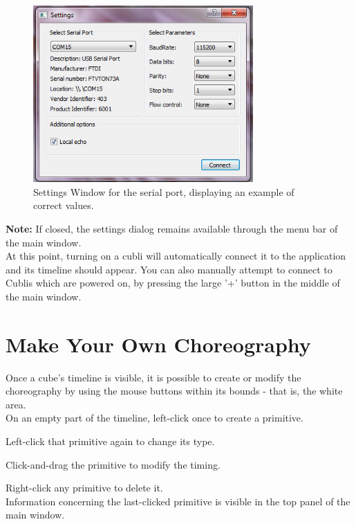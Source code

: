 \begin{figure}[ht]
   \centering
   \includegraphics[width=0.75\textwidth]{img/SerialSettings.png}
   \caption{Settings Window for the serial port, displaying an example of correct values.}
   \label{img:SerialSettings}
\end{figure}

\textbf{Note:} If closed, the settings dialog remains available through the menu bar of the main window.\\

At this point, turning on a cubli will automatically connect it to the application and its timeline should appear. You can also manually attempt to connect to Cublis which are powered on, by pressing the large '+' button in the middle of the main window.


\section{Make Your Own Choreography}

Once a cube's timeline is visible, it is possible to create or modify the choreography by using the mouse buttons within its bounds - that is, the white area.\\

On an empty part of the timeline, left-click once to create a primitive.

Left-click that primitive again to change its type.

Click-and-drag the primitive to modify the timing.

Right-click any primitive to delete it.\\

Information concerning the last-clicked primitive is visible in the top panel of the main window.\\

